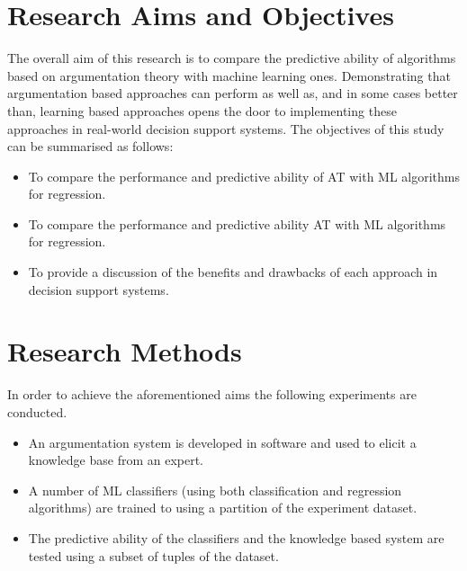 
\section{Research Aims and Objectives}

The overall aim of this research is to compare the predictive ability of algorithms based on argumentation theory with machine learning ones.
Demonstrating that argumentation based approaches can perform as well as, and in some cases better than, learning based approaches opens the door to implementing these approaches in real-world decision support systems.
The objectives of this study can be summarised as follows:

\begin{itemize}

  \item To compare the performance and predictive ability of AT with ML algorithms for regression.
  \item To compare the performance and predictive ability AT with ML algorithms for regression.
  \item To provide a discussion of the benefits and drawbacks of each approach in decision support systems.

\end{itemize}


\section{Research Methods}

In order to achieve the aforementioned aims the following experiments are conducted.

\begin{itemize}

  \item An argumentation system is developed in software and used to elicit a knowledge base from an expert.
  \item A number of ML classifiers (using both classification and regression algorithms) are trained to using a partition of the experiment dataset.
  \item The predictive ability of the classifiers and the knowledge based system are tested using a subset of tuples of the dataset.

\end{itemize}

